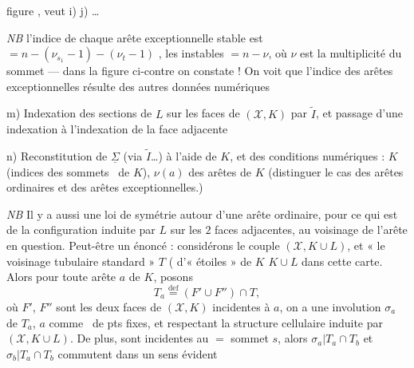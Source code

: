 \documentclass[11pt,a4paper]{article}
\begin{document}
figure ,   veut i) j) \ldots

\emph{NB} l'indice de chaque arête exceptionnelle stable est $= n - (\nu_{s_1} - 1) - (\nu_t - 1)$ \struck{\ill{}},  les instables $= n - \nu$, où $\nu$ est la multiplicité du sommet --- dans la figure ci-contre on constate ! On voit que l'indice des arêtes exceptionnelles résulte des autres données numériques

m) Indexation des sections de $L$ sur les faces de $(\mathcal{X}, K)$  par $\widetilde{I}$, et passage d'une indexation à l'indexation de la face adjacente

n) Reconstitution de \struck{$\Sigma$} $\underline{\Sigma}$ (via $\widetilde{I}$\ldots) à l'aide de $K$, et des conditions numériques  \ill{} : $K$ (indices des sommets \ de $K$), $\nu(a)$ des arêtes \add{\ill{}} de $K$ \struck{\ill{}} (distinguer le cas des arêtes \add{\ill{}} ordinaires et des arêtes exceptionnelles.)

\emph{NB} Il y a aussi  une loi de symétrie autour d'une arête ordinaire, pour ce qui est de la configuration induite par $L$ sur les $2$ faces adjacentes, au voisinage de l'arête en question. Peut-être un énoncé \ill{} : considérons le couple $(\mathcal{X}, K \cup L)$, et « le voisinage tubulaire standard » $T$ ( d'« étoiles » \add{\ill{} \ill{}} de $K$  $K \cup L$ dans cette carte. \struck{\ill{}} Alors pour toute arête $a$ de $K$, posons
\[
T_a \overset{\mathrm{def}}{=} (F' \cup F'') \cap T,
\]
où $F'$, $F''$ sont les deux faces de $(\mathcal{X}, K)$ incidentes à $a$, on a une involution $\sigma_a$ de $T_a$,  $a$ comme \ de pts fixes, et respectant la structure cellulaire induite par $(\mathcal{X}, K \cup L)$. De plus,  \ill{} sont incidentes au $=$ sommet $s$, alors $\sigma_a | T_a \cap T_b$ et $\sigma_b | T_a \cap T_b$ commutent dans un sens évident
\end{document}
